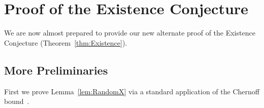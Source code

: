 \documentclass[11pt]{article}
\newcounter{i}
\theoremstyle{plain}
\newtheorem{lem}[thm]{Lemma}
\theoremstyle{plain} %
\theoremstyle{definition}
\begin{document}
\section{Proof of the Existence Conjecture}\label{s:Existence}

We are now almost prepared to provide our new alternate proof of the Existence Conjecture (Theorem~\ref{thm:Existence}).

\subsection{More Preliminaries}

First we prove Lemma~\ref{lem:RandomX} via a standard application of the Chernoff bound~\cite{AS16}.




\end{document}
